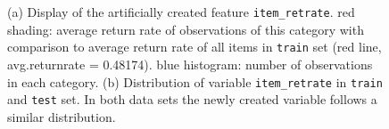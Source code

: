 \documentclass[a4paper,12pt]{article}
\begin{document}
\begin{figure}
	\caption{(a) Display of the artificially created feature \texttt{item\_retrate}. red shading: average return rate of observations of this category with comparison to average return rate of all items in \texttt{train} set (red line, avg.returnrate = 0.48174). blue histogram: number of observations in each category. (b) Distribution of variable \texttt{item\_retrate} in \texttt{train} and \texttt{test} set. In both data sets the newly created variable follows a similar distribution. }%
	\label{Figure::ItemRetrate}
\end{figure}
\end{document}

